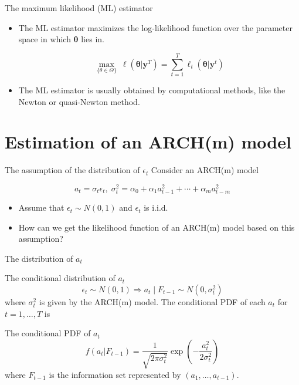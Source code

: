 \documentclass[presentation,10pt]{beamer}
\begin{document}
\begin{frame}[label={sec:orgdadc7fe}]{The maximum likelihood (ML) estimator}
\begin{itemize}
\item The ML estimator maximizes the log-likelihood function over the
parameter space in which \(\boldsymbol{\theta}\) lies in.

\begin{equation}
\operatorname*{max}_{\{\theta \in \Theta\}}\: \ell(\boldsymbol{\theta} | \mathbf{y}^T) = \sum_{t=1}^T \ell_t(\boldsymbol{\theta} | \mathbf{y}^t)
\end{equation}

\item The ML estimator is usually obtained by computational methods, like
the Newton or quasi-Newton method.
\end{itemize}
\end{frame}

\section{Estimation of an ARCH(m) model}
\label{sec:org2ae18ba}

\begin{frame}[label={sec:orgf934e8d}]{The assumption of the distribution of \(\epsilon_t\)}
Consider an ARCH(m) model

\begin{equation*}
a_t = \sigma_t \epsilon_t,\; \sigma^2_t = \alpha_0 + \alpha_1 a^2_{t-1} + \cdots + \alpha_m a^2_{t-m}
\end{equation*}

\begin{itemize}
\item Assume that \(\epsilon_t \sim N(0, 1)\) and \(\epsilon_t\) is i.i.d.

\item How can we get the likelihood function of an ARCH(m) model based on
this assumption?
\end{itemize}
\end{frame}

\begin{frame}[label={sec:orgd3a8754}]{The distribution of \(a_t\)}
\begin{block}{The conditional distribution of \(a_t\)}
\[ \epsilon_t \sim N(0, 1) \Rightarrow a_t \mid F_{t-1} \sim N(0,
\sigma^2_t) \] 
where \(\sigma^2_t\) is given by the ARCH(m) model. The
conditional PDF of each \(a_t\) for \(t=1, \ldots, T\) is
\end{block}

\begin{block}{The conditional PDF of \(a_t\)}
\[
f(a_t | F_{t-1}) = \frac{1}{\sqrt{2 \pi \sigma^2_t}} \exp
\left(-\frac{a^2_t}{2\sigma^2_t}\right)
\] 
where \(F_{t-1}\) is the information set represented by \((a_1, \ldots,
a_{t-1})\).
\end{block}
\end{frame}
\end{document}
